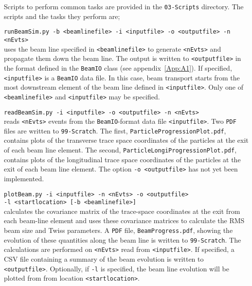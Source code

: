 Scripts to perform common tasks are provided in
the \texttt{03-Scripts} directory.  
The scripts and the tasks they perform are;
\begin{description}
  \item{\texttt{runBeamSim.py -b <beamlinefile> -i <inputfile> -o <outputfile> -n <nEvts>}} \\
    uses the beam line specified in \texttt{<beamlinefile>} to
    generate \texttt{<nEvts>} and propagate them down the beam line.
    The output is written to \texttt{<outputfile>} in the format
    defined in the \texttt{BeamIO} class (see appendix~\ref{App:A1}).
    If specified, \texttt{<inputfile>} is a \texttt{BeamIO} data
    file.
    In this case, beam transport starts from the most downstream
    element of the beam line defined in \texttt{<inputfile>}.
    Only one of \texttt{<beamlinefile>} and \texttt{<inputfile>} may
    be specified.
  \item{\texttt{readBeamSim.py -i <inputfile> -o <outputfile> -n <nEvts>}} \\
    reads \texttt{<nEvts>} events from the \texttt{BeamIO}-format
    data file \texttt{<inputfile>}.
    Two \texttt{PDF} files are written to \texttt{99-Scratch}.
    The first, \texttt{ParticleProgressionPlot.pdf}, contains plots of
    the transverse trace space coordinates of the particles at the
    exit of each beam line element.
    The second, \texttt{ParticleLongiProgressionPlot.pdf}, contains
    plots of the longitudinal trace space coordinates of the particles
    at the exit of each beam line element.
    The option \texttt{-o <outputfile>} has not yet been
    implemented.
  \item{\texttt{plotBeam.py -i <inputfile> -n <nEvts> -o <outputfile> \\
    -l <startlocation> [-b <beamlinefile>]}} \\
    calculates the covariance matrix of the trace-space coordinates at
    the exit from each beam-line element and uses these covariance
    matrices to calculate the RMS beam size and Twiss parameters.
    A \texttt{PDF} file, \texttt{BeamProgress.pdf}, showing the
    evolution of these quantities along the beam line is written
    to \texttt{99-Scratch}.
    The calculations are performed on \texttt{<nEvts>} read
    from \texttt{<inputfile>}.
    If specified, a CSV file containing a summary of the beam
    evolution is written to \texttt{<outputfile>}.
    Optionally, if \texttt{-l} is specified, the beam line evolution
    will be plotted from from location \texttt{<startlocation>}.

\end{description}
